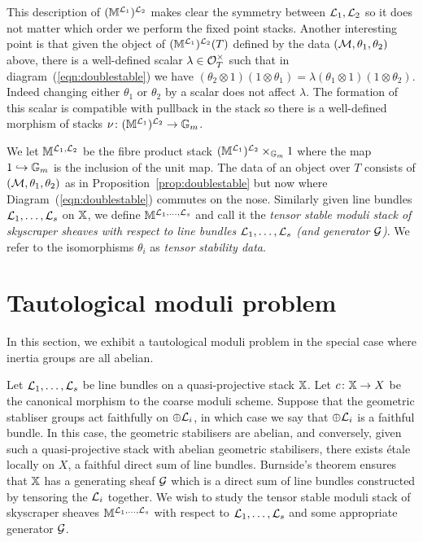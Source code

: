 \documentclass[12pt]{amsart}
\begin{document}
This description of $(\mathbb{M}^{\mathcal{L}_1})^{\mathcal{L}_2}$ makes clear the symmetry between $\mathcal{L}_1, \mathcal{L}_2$ so it does not matter which order we perform the fixed point stacks. Another interesting point is that given the object of $(\mathbb{M}^{\mathcal{L}_1})^{\mathcal{L}_2}(T)$ defined by the data $(\mathcal{M}, \theta_1, \theta_2)$ above, there is a well-defined scalar $\lambda \in \mathcal{O}_T^{\times}$ such that in diagram~(\ref{eqn:doublestable}) we have $(\theta_2 \otimes 1) (1 \otimes \theta_1) = \lambda (\theta_1 \otimes 1) (1 \otimes \theta_2)$. Indeed changing either $\theta_1$ or 
$\theta_2$ by a scalar does not affect $\lambda$. The formation of this scalar is compatible with pullback in the stack so there is a well-defined morphism of stacks $\nu \colon (\mathbb{M}^{\mathcal{L}_1})^{\mathcal{L}_2} \rightarrow \mathbb{G}_m$. 

\begin{definition}  \label{defn:doubletensor}
We let $\mathbb{M}^{\mathcal{L}_1,\mathcal{L}_2}$ be the fibre product stack $(\mathbb{M}^{\mathcal{L}_1})^{\mathcal{L}_2} \times_{\mathbb{G}_m} 1$ where the map $1 \hookrightarrow \mathbb{G}_m$ is the inclusion of the unit map. The data of an object over $T$ consists of $(\mathcal{M}, \theta_1, \theta_2)$ as in Proposition~\ref{prop:doublestable} but now where Diagram~(\ref{eqn:doublestable}) commutes on the nose. Similarly given line bundles $\mathcal{L}_1,\ldots,\mathcal{L}_s$ on $\mathbb{X}$, we define $\mathbb{M}^{\mathcal{L}_1,\ldots,\mathcal{L}_s}$ and call it the {\em tensor stable moduli stack of skyscraper sheaves with respect to line bundles $\mathcal{L}_1, \ldots, \mathcal{L}_s$ (and generator $\mathcal{G}$)}. We refer to the isomorphisms $\theta_i$ as {\em tensor stability data}.
\end{definition}



\section{Tautological moduli problem}

In this section, we exhibit a tautological moduli problem in the special case where inertia groups are all abelian.

Let $\mathcal{L}_1, \ldots, \mathcal{L}_s$ be line bundles on a quasi-projective stack $\mathbb{X}$. Let $c \colon \mathbb{X} \to X$ be the canonical morphism to the coarse moduli scheme. Suppose that the geometric stabliser groups act faithfully on $\oplus \mathcal{L}_i$, in which case we say that $\oplus \mathcal{L}_i$ is a faithful bundle. In this case, the geometric stabilisers are abelian, and conversely, given such a quasi-projective stack with abelian geometric stabilisers, there exists \'etale locally on $X$, a faithful direct sum of line bundles. Burnside's theorem ensures that $\mathbb{X}$ has a generating sheaf $\mathcal{G}$ which is  a direct sum of line bundles constructed by tensoring the $\mathcal{L}_i$ together. We wish to study the tensor stable moduli stack of skyscraper sheaves $\mathbb{M}^{\mathcal{L}_1,\ldots,\mathcal{L}_s}$ with respect to $\mathcal{L}_1, \ldots, \mathcal{L}_s$ and some appropriate generator $\mathcal{G}$. 
\end{document}
